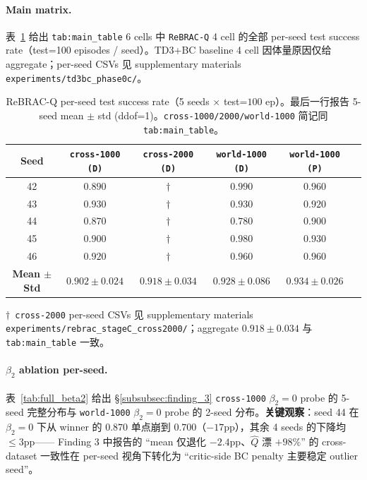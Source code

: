 \paragraph{Main matrix.}\quad
表~\ref{tab:full_main} 给出 \texttt{tab:main\_table} 6 cells 中 \texttt{ReBRAC-Q} 4 cell 的全部 per-seed test success rate（test=100 episodes / seed）。TD3+BC baseline 4 cell 因体量原因仅给 aggregate；per-seed CSVs 见 supplementary materials \texttt{experiments/td3bc\_phase0c/}。

\begin{table}[h]
\centering
\small
\caption{ReBRAC-Q per-seed test success rate（5 seeds $\times$ test=$100$ ep）。最后一行报告 5-seed mean $\pm$ std (ddof=1)。\texttt{cross-1000/2000/world-1000} 简记同 \texttt{tab:main\_table}。}
\label{tab:full_main}
\begin{tabular}{cccccc}
\toprule
\textbf{Seed} & \texttt{cross-1000 (D)} & \texttt{cross-2000 (D)} & \texttt{world-1000 (D)} & \texttt{world-1000 (P)} \\
\midrule
42 & $0.890$ & $\dagger$ & $0.990$ & $0.960$ \\
43 & $0.930$ & $\dagger$ & $0.930$ & $0.920$ \\
44 & $0.870$ & $\dagger$ & $0.780$ & $0.900$ \\
45 & $0.900$ & $\dagger$ & $0.980$ & $0.930$ \\
46 & $0.920$ & $\dagger$ & $0.960$ & $0.960$ \\
\midrule
\textbf{Mean $\pm$ Std} & $0.902 \pm 0.024$ & $0.918 \pm 0.034$ & $0.928 \pm 0.086$ & $0.934 \pm 0.026$ \\
\bottomrule
\end{tabular}
\end{table}

$\dagger$\ \texttt{cross-2000} per-seed CSVs 见 supplementary materials \texttt{experiments/rebrac\_stageC\_cross2000/}；aggregate $0.918 \pm 0.034$ 与 \texttt{tab:main\_table} 一致。

\paragraph{$\beta_2$ ablation per-seed.}\quad
表~\ref{tab:full_beta2} 给出 \S\ref{subsubsec:finding_3} \texttt{cross-1000} $\beta_2\!=\!0$ probe 的 5-seed 完整分布与 \texttt{world-1000} $\beta_2\!=\!0$ probe 的 2-seed 分布。\textbf{关键观察}：seed 44 在 $\beta_2\!=\!0$ 下从 winner 的 $0.870$ 单点崩到 $0.700$（$-17$pp），其余 4 seeds 的下降均 $\leq 3$pp—— Finding 3 中报告的 ``mean 仅退化 $-2.4$pp、$\hat{Q}$ 漂 $+98\%$'' 的 cross-dataset 一致性在 per-seed 视角下转化为 ``critic-side BC penalty 主要稳定 outlier seed''。

